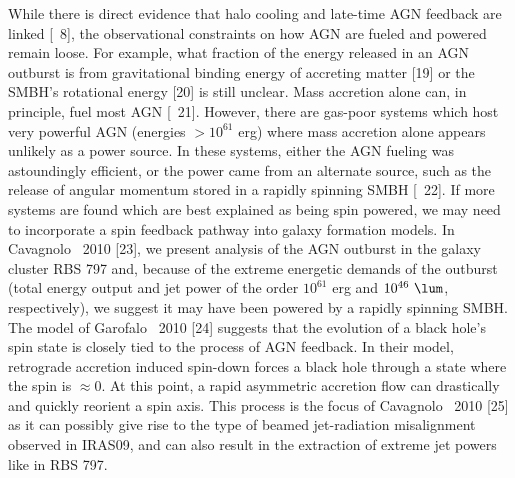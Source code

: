 \documentclass[letterpaper,12pt]{article}
\newcommand{\myhead}{Cavagnolo, Research Summary}
\begin{document}
While there is direct evidence that halo cooling and late-time AGN
feedback are linked [\eg\ 8], the observational constraints on how AGN
are fueled and powered remain loose. For example, what fraction of the
energy released in an AGN outburst is from gravitational binding
energy of accreting matter [19] or the SMBH's rotational energy [20]
is still unclear. Mass accretion alone can, in principle, fuel most
AGN [\eg\ 21]. However, there are gas-poor systems which host very
powerful AGN (energies $> 10^{61}$ erg) where mass accretion alone
appears unlikely as a power source. In these systems, either the AGN
fueling was astoundingly efficient, or the power came from an
alternate source, such as the release of angular momentum stored in a
rapidly spinning SMBH [\eg\ 22]. If more systems are found which are
best explained as being spin powered, we may need to incorporate a
spin feedback pathway into galaxy formation models. In Cavagnolo
\etal\ 2010 [23], we present analysis of the AGN outburst in the
galaxy cluster RBS 797 and, because of the extreme energetic demands
of the outburst (total energy output and jet power of the order
$10^{61}$ erg and $10^{46} ~\lum$, respectively), we suggest it may
have been powered by a rapidly spinning SMBH. The model of Garofalo
\etal\ 2010 [24] suggests that the evolution of a black hole's spin
state is closely tied to the process of AGN feedback. In their model,
retrograde accretion induced spin-down forces a black hole through a
state where the spin is $\approx 0$. At this point, a rapid asymmetric
accretion flow can drastically and quickly reorient a spin axis. This
process is the focus of Cavagnolo \etal\ 2010 [25] as it can possibly
give rise to the type of beamed jet-radiation misalignment observed in
IRAS09, and can also result in the extraction of extreme jet powers
like in RBS 797.

\markright{\myhead}

\end{document}
